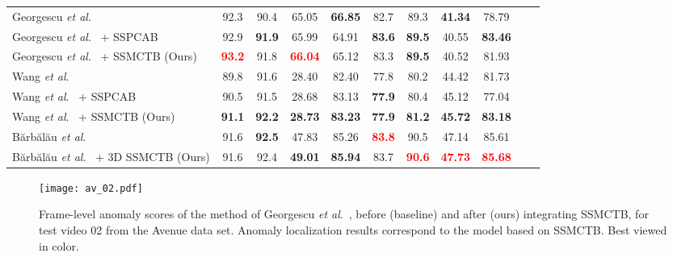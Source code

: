 \documentclass[10pt,journal,compsoc]{IEEEtran}
\newcommand{\etal}{\textit{et al}.}
\begin{document}
\begin{table*}[t]
\begin{tabular}{| l | c | c | c | c | c | c | c | c |  c | c |}
 \hline
Georgescu \etal~\cite{Georgescu-TPAMI-2021} &  92.3 & 90.4 & 65.05 & \textbf{66.85} &  82.7 & 89.3 & \textbf{41.34} & 78.79 \\
Georgescu \etal~\cite{Georgescu-TPAMI-2021} + SSPCAB \cite{Ristea-CVPR-2022} & 92.9 & \textbf{91.9} & 65.99 & 64.91 & \textbf{83.6} & \textbf{89.5} &  40.55 & \textbf{83.46}  \\
Georgescu \etal~\cite{Georgescu-TPAMI-2021} + SSMCTB (Ours) & \textcolor{red}{\textbf{93.2}} & 91.8 & \textcolor{red}{\textbf{66.04}} & 65.12 & 83.3 & \textbf{89.5} &  40.52 & 81.93 \\
\hline
Wang \etal~\cite{Wang-ICDM-2022} & 89.8 & 91.6 & 28.40 & 82.40 & 77.8 & 80.2 & 44.42	& 81.73 \\
Wang \etal~\cite{Wang-ICDM-2022} + SSPCAB~\cite{Ristea-CVPR-2022} & 90.5 & 91.5 & 28.68 & 83.13 & \textbf{77.9} & 80.4 & 45.12 & 77.04 \\
Wang \etal~\cite{Wang-ICDM-2022} + SSMCTB (Ours) & \textbf{91.1} & \textbf{92.2} & \textbf{28.73} & \textbf{83.23} & \textbf{77.9} & \textbf{81.2} & \textbf{45.72} & \textbf{83.18} \\
\hline
B\u{a}rb\u{a}l\u{a}u \etal~\cite{Barbalau-ARXIV-2022} & 91.6 & \textbf{92.5} & 47.83 & 85.26 & \textcolor{red}{\textbf{83.8}} & 90.5 & 47.14 & 85.61 \\
B\u{a}rb\u{a}l\u{a}u \etal~\cite{Barbalau-ARXIV-2022} + 3D SSMCTB (Ours) & 91.6 & 92.4 & \textbf{49.01} & \textbf{85.94} & 83.7 & \textcolor{red}{\textbf{90.6}} & \textcolor{red}{\textbf{47.73}} & \textcolor{red}{\textbf{85.68}} \\
\hline
\end{tabular}
\vspace{-0.2cm}
\label{table:VideoAnomaly} \end{table*}

\begin{figure}[t]
\begin{center}
\centerline{\texttt{[image: av\_02.pdf]}}
\vspace{-0.2cm}
\caption{Frame-level anomaly scores of the method of Georgescu \etal~\cite{Georgescu-TPAMI-2021}, before (baseline) and after (ours) integrating SSMCTB, for test video 02 from the Avenue data set. Anomaly localization results correspond to the model based on SSMCTB. Best viewed in color.}
\label{fig_results_avenue}
\vspace{-0.2cm}
\end{center}
\end{figure}
\end{document}
